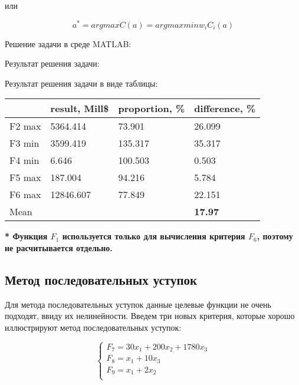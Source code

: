 \documentclass[14pt,a4paper,report]{report}
\begin{document}
или

\begin{equation*}
\text{$a^*=arg max C(a)=arg max min w_iC_i(a)$}
\end{equation*}

Решение задачи в среде MATLAB:





Результат решения задачи:



Результат решения задачи в виде таблицы:

\begin{table}[h!]
	\centering
	\bgroup
	\def\arraystretch{1}
	\begin{tabular}{ | m{1.2cm} | m{1.9cm} | m{2.2cm} | m{2.2cm} | }
		\hline
		& result, Mill\$ & proportion, \% & difference, \% \\ \hline
		F2 max & 5364.414 & 73.901 & 26.099 \\ \hline
		F3 min & 3599.419 & 135.317 & 35.317 \\ \hline
		F4 min & 6.646 & 100.503 & 0.503 \\ \hline
		F5 max & 187.004 & 94.216 & 5.784 \\ \hline
		F6 max & 12846.607 & 77.849 & 22.151 \\ \hline
		Mean & & & \textbf{17.97} \\
		\hline
	\end{tabular}
	\egroup
\end{table}

\textbf{* Функция $F_1$ используется только для вычисления критерия $F_6$, поэтому не расчитывается отдельно.}

\subsection{Метод последовательных уступок}

Для метода последовательных уступок данные целевые функции не очень подходят, ввиду их нелинейности. Введем три новых критерия, которые хорошо иллюстрируют метод последовательных уступок:

\begin{equation*}
\begin{cases}
\text{$F_7=30x_1+200x_2+1780x_3$} \\
\text{$F_8=x_1+10x_3$} \\
\text{$F_9=x_1+2x_2$} \\
\end{cases}
\end{equation*}
\end{document}
